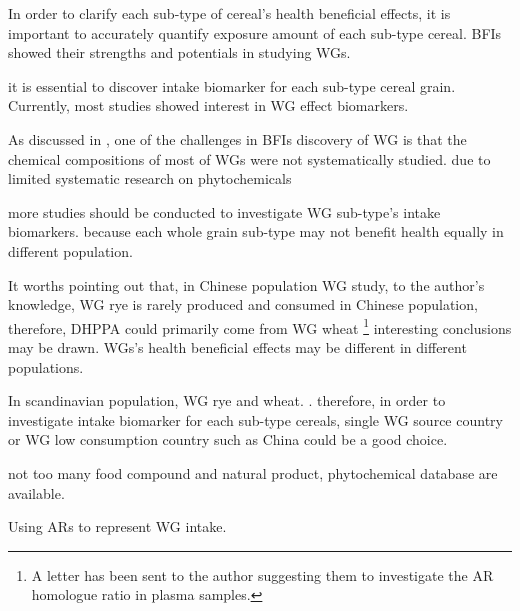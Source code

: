 In order to clarify each sub-type of cereal's health beneficial effects, it is important to accurately quantify exposure amount of each sub-type cereal. BFIs showed their strengths and potentials in studying WGs. 

it is essential to discover intake biomarker for each sub-type cereal grain.
Currently, most studies showed interest in WG effect biomarkers.

As discussed in \cite{ISI:000447355100002}, one of the challenges in BFIs discovery of WG is that the chemical compositions of most of WGs were not systematically studied. due to limited systematic research on phytochemicals 

more studies should be conducted to investigate WG sub-type's intake biomarkers. because each whole grain sub-type may not benefit health equally in different population.

It worths pointing out that, in Chinese population WG study, to the author's knowledge, WG rye is rarely produced and consumed in Chinese population, therefore, DHPPA could primarily come from WG wheat \footnote{A letter has been sent to the author suggesting them to investigate the AR homologue ratio in plasma samples. }
interesting conclusions may be drawn. WGs's health beneficial effects may be different in different populations.

In scandinavian population, WG rye and wheat. . therefore, in order to investigate intake biomarker for each sub-type cereals, single WG source country or WG low consumption country such as China could be a good choice.

not too many food compound and natural product, phytochemical database are available.

Using ARs to represent WG intake.
